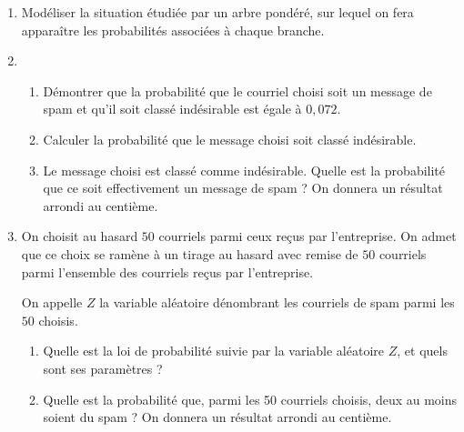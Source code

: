 \begin{enumerate}
\item Modéliser la situation étudiée par un arbre pondéré, sur lequel on fera apparaître les probabilités associées à chaque branche.
\item 
	\begin{enumerate}
		\item Démontrer que la probabilité que le courriel choisi soit un message de spam et qu'il soit classé indésirable est égale à $0,072$.
		\item Calculer la probabilité que le message choisi soit classé indésirable.
		\item Le message choisi est classé comme indésirable. Quelle est la probabilité que ce soit effectivement un message de spam ? On donnera un résultat arrondi au centième.
	\end{enumerate}
\item On choisit au hasard $50$ courriels parmi ceux reçus par l'entreprise. On admet que ce choix se ramène à un tirage au hasard avec remise de $50$ courriels parmi l'ensemble des courriels reçus par l'entreprise.

On appelle $Z$ la variable aléatoire dénombrant les courriels de spam parmi les $50$ choisis.
	\begin{enumerate}
		\item Quelle est la loi de probabilité suivie par la variable aléatoire $Z$, et quels sont ses paramètres ?
		\item Quelle est la probabilité que, parmi les 50 courriels choisis, deux au moins soient du spam ? On donnera un résultat arrondi au centième.
	\end{enumerate}
\end{enumerate}

\bigskip

